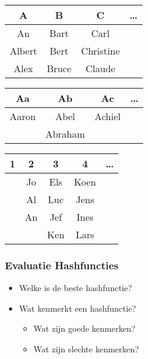 \documentclass[dutch]{ucll-slides}
\begin{document}
\begin{frame}
\begin{overprint}
    \begin{center}
      \begin{tabular}{cccc}
        \bfseries A & \bfseries B & \bfseries C & \dots \\
        \toprule
        An & Bart & Carl \\
        Albert & Bert & Christine \\
        Alex & Bruce & Claude \\
      \end{tabular}
    \end{center}

    \begin{center}
      \begin{tabular}{cccc}
        \bfseries Aa & \bfseries Ab & \bfseries Ac & \dots \\
        \toprule
        Aaron & Abel & Achiel \\
         & Abraham &  \\
      \end{tabular}
    \end{center}

    \begin{center}
      \begin{tabular}{ccccc}
        \bfseries 1 & \bfseries 2 & \bfseries 3 & \bfseries 4 & \dots \\
        \toprule
         & Jo & Els & Koen \\
         & Al & Luc & Jens \\
         & An & Jef & Ines \\
         &    & Ken & Lars \\
      \end{tabular}
    \end{center}

  \end{overprint}
\end{frame}

\begin{frame}
  \frametitle{Evaluatie Hashfuncties}
  \begin{itemize}
    \item Welke is de beste hashfunctie?
    \item Wat kenmerkt een hashfunctie?
          \begin{itemize}
            \item Wat zijn goede kenmerken?
            \item Wat zijn slechte kenmerken?
          \end{itemize}
  \end{itemize}
\end{frame}
\end{document}

